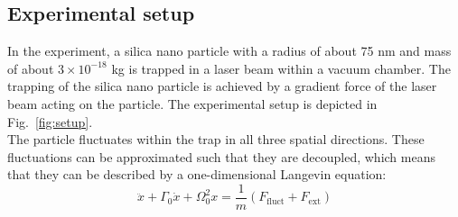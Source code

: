 \documentclass[12pt]{article}
\begin{document}
\subsection{Experimental setup}
In the experiment, a silica nano particle with a radius of about 75 nm and mass of about $3 \times 10^{-18}$ kg is trapped in a laser beam within a
vacuum chamber. The trapping of the silica nano particle is achieved by a gradient force of the
laser beam acting on the particle. The experimental setup is depicted in Fig.~\ref{fig:setup}.\\
The particle fluctuates within the trap in all three spatial directions. These fluctuations can be approximated
such that they are decoupled, which means that they can be described by a one-dimensional Langevin equation:
\begin{equation}
    \label{eq:langevin}
    \ddot{x} + \Gamma_0 \dot{x} + \Omega^2_0x = \frac 1 m \left(F_\text{fluct} + F_\text{ext}\right)
\end{equation}
\end{document}

